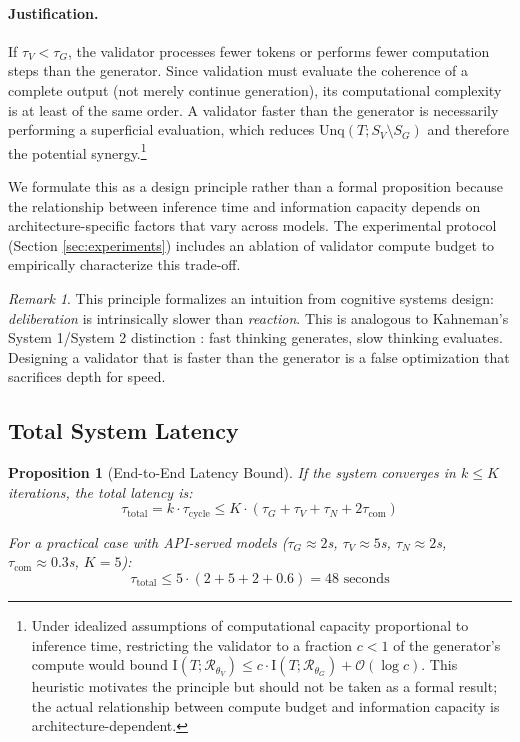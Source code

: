 \documentclass[11pt,a4paper]{article}
\newtheorem{proposition}{Proposition}[section]
\theoremstyle{remark}
\newtheorem{remark}{Remark}[section]
\newcommand{\Unq}{\mathrm{Unq}}
\newcommand{\MI}{\mathrm{I}}
\begin{document}
\paragraph{Justification.} If $\tau_V < \tau_G$, the validator processes fewer tokens or performs fewer computation steps than the generator. Since validation must evaluate the coherence of a complete output (not merely continue generation), its computational complexity is at least of the same order. A validator faster than the generator is necessarily performing a superficial evaluation, which reduces $\Unq(T; S_V \setminus S_G)$ and therefore the potential synergy.\footnote{Under idealized assumptions of computational capacity proportional to inference time, restricting the validator to a fraction $c < 1$ of the generator's compute would bound $\MI(T; \mathcal{R}_{\theta_V}) \leq c \cdot \MI(T; \mathcal{R}_{\theta_G}) + \mathcal{O}(\log c)$. This heuristic motivates the principle but should not be taken as a formal result; the actual relationship between compute budget and information capacity is architecture-dependent.}

We formulate this as a design principle rather than a formal proposition because the relationship between inference time and information capacity depends on architecture-specific factors that vary across models. The experimental protocol (Section \ref{sec:experiments}) includes an ablation of validator compute budget to empirically characterize this trade-off.

\begin{remark}
\label{rem:asymmetry}
This principle formalizes an intuition from cognitive systems design: \emph{deliberation} is intrinsically slower than \emph{reaction}. This is analogous to Kahneman's System 1/System 2 distinction \cite{kahneman2011thinking}: fast thinking generates, slow thinking evaluates. Designing a validator that is faster than the generator is a false optimization that sacrifices depth for speed.
\end{remark}

\subsection{Total System Latency}

\begin{proposition}[End-to-End Latency Bound]
\label{prop:total_latency}
If the system converges in $k \leq K$ iterations, the total latency is:
\begin{equation}
  \tau_{\text{total}} = k \cdot \tau_{\text{cycle}} \leq K \cdot (\tau_G + \tau_V + \tau_N + 2\tau_{\text{com}})
\end{equation}

For a practical case with API-served models ($\tau_G \approx 2$s, $\tau_V \approx 5$s, $\tau_N \approx 2$s, $\tau_{\text{com}} \approx 0.3$s, $K = 5$):
\begin{equation}
  \tau_{\text{total}} \leq 5 \cdot (2 + 5 + 2 + 0.6) = 48 \text{ seconds}
\end{equation}
\end{proposition}
\end{document}

